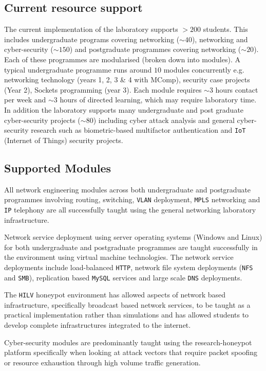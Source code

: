 \subsection{Current resource support}\label{ResourceSupport}
The current implementation of the laboratory supports $>200$ students. This includes undergraduate programs covering networking ($\sim40$), networking and cyber-security ($\sim150$) and postgraduate programmes covering networking ($\sim20$). Each of these programmes are modularised (broken down into modules).  A typical undergraduate programme runs around $10$ modules concurrently e.g. networking technology (years 1, 2, 3 \& 4 with MComp), security case projects (Year 2), Sockets programming (year 3). Each module requires $\sim3$ hours contact per week and $\sim3$ hours of directed learning, which may require laboratory time. In addition the laboratory supports many undergraduate and post graduate cyber-security projects ($\sim80$) including cyber attack analysis and general cyber-security research such as biometric-based multifactor authentication and \texttt{IoT} (Internet of Things) security projects.

\subsection{Supported Modules}\label{Modules}
All network engineering modules across both undergraduate and postgraduate programmes involving routing, switching, \texttt{VLAN} deployment, \texttt{MPLS} networking and \texttt{IP} telephony are all successfully taught using the general networking laboratory infrastructure. 

Network service deployment using server operating systems (Windows and Linux) for both undergraduate and postgraduate programmes are taught successfully in the environment using virtual machine technologies. The network service deployments include load-balanced \texttt{HTTP}, network file system deployments (\texttt{NFS} and \texttt{SMB}), replication based \texttt{MySQL} services and large scale \texttt{DNS} deployments.  

The \texttt{HILV} honeypot environment has allowed aspects of network based infrastructure, specifically broadcast based network services, to be taught as a practical implementation rather than simulations and has allowed students to develop complete infrastructures integrated to the internet.

Cyber-security modules are predominantly taught using the research-honeypot platform specifically when looking at attack vectors that require packet spoofing or resource exhaustion through high volume traffic generation.

